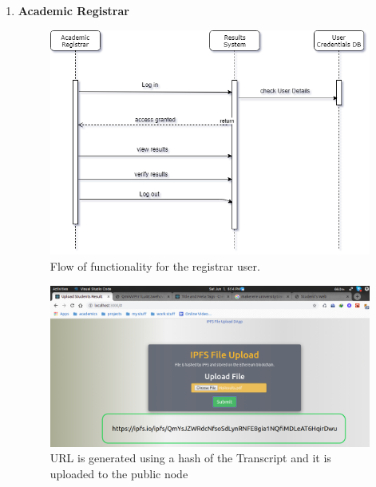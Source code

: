 \begin{enumerate}
\item \textbf{Academic Registrar}
\begin{figure}[H]
\caption{Flow of functionality for the registrar user.}
\includegraphics[scale=0.5]{images/SequenceRegistrar.png}
\end{figure}
\begin{figure}[H]
\includegraphics[scale=0.4]{images/UploadToIPFS.png}
\caption{URL is generated using a hash of the Transcript and it is uploaded to the public node}
\end{figure}


\end{enumerate}
